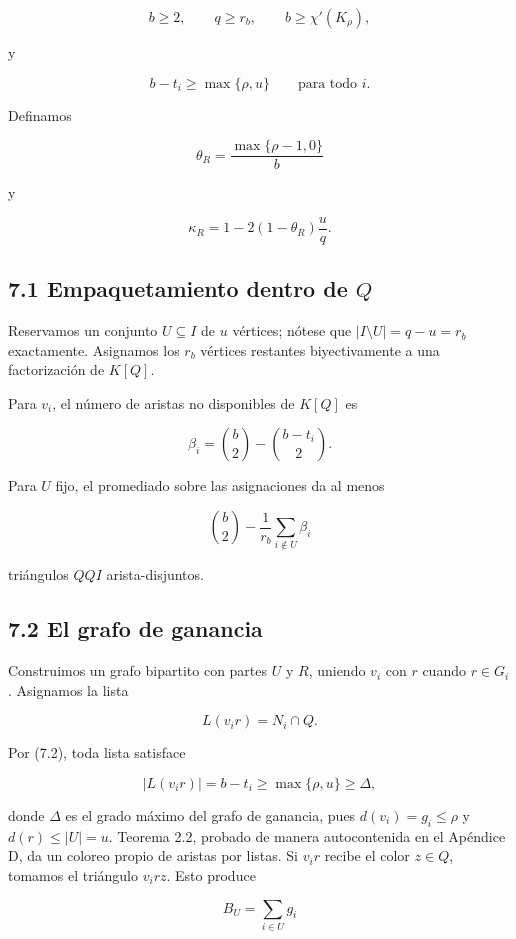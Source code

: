 \documentclass[
  11pt,
]{article}
\begin{document}
\[
b\ge2,
\qquad
q\ge r_b,
\qquad
b\ge\chi'(K_\rho),
\tag{7.1}
\]

y

\[
b-t_i\ge\max\{\rho,u\}
\qquad
\text{para todo }i.
\tag{7.2}
\]

Definamos

\[
\theta_R=\frac{\max\{\rho-1,0\}}{b}
\]

y

\[
\kappa_R
=
1-2(1-\theta_R)\frac{u}{q}.
\tag{7.3}
\]

\subsection{\texorpdfstring{7.1 Empaquetamiento dentro de
\(Q\)}{7.1 Empaquetamiento dentro de Q}}\label{empaquetamiento-dentro-de-q}

Reservamos un conjunto \(U\subseteq I\) de \(u\) vértices; nótese que
\(|I\setminus U|=q-u=r_b\) exactamente. Asignamos los \(r_b\) vértices
restantes biyectivamente a una factorización de \(K[Q]\).

Para \(v_i\), el número de aristas no disponibles de \(K[Q]\) es

\[
\beta_i
=
\binom b2-\binom{b-t_i}{2}.
\tag{7.4}
\]

Para \(U\) fijo, el promediado sobre las asignaciones da al menos

\[
\binom b2-\frac1{r_b}\sum_{i\notin U}\beta_i
\tag{7.5}
\]

triángulos \(QQI\) arista-disjuntos.

\subsection{7.2 El grafo de ganancia}\label{el-grafo-de-ganancia}

Construimos un grafo bipartito con partes \(U\) y \(R\), uniendo \(v_i\)
con \(r\) cuando \(r\in G_i\). Asignamos la lista

\[
L(v_ir)=N_i\cap Q.
\]

Por (7.2), toda lista satisface

\[
|L(v_ir)|=b-t_i
\ge
\max\{\rho,u\}
\ge
\Delta,
\]

donde \(\Delta\) es el grado máximo del grafo de ganancia, pues
\(d(v_i)=g_i\le\rho\) y \(d(r)\le|U|=u\). Teorema 2.2, probado de manera
autocontenida en el Apéndice D, da un coloreo propio de aristas por
listas. Si \(v_ir\) recibe el color \(z\in Q\), tomamos el triángulo
\(v_irz\). Esto produce

\[
B_U=\sum_{i\in U}g_i
\]
\end{document}
